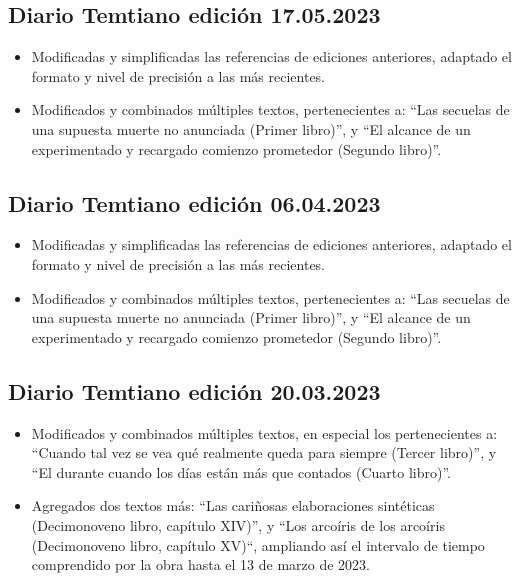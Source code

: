 \documentclass[
]{book}
\begin{document}
\hypertarget{diario-temtiano-ediciuxf3n-17.05.2023}{%
\subsection*{Diario Temtiano edición 17.05.2023}\label{diario-temtiano-ediciuxf3n-17.05.2023}}

\begin{itemize}
\item
  Modificadas y simplificadas las referencias de ediciones anteriores, adaptado el formato y nivel de precisión a las más recientes.
\item
  Modificados y combinados múltiples textos, pertenecientes a: ``Las secuelas de una supuesta muerte no anunciada (Primer libro)'', y ``El alcance de un experimentado y recargado comienzo prometedor (Segundo libro)''.
\end{itemize}

\hypertarget{diario-temtiano-ediciuxf3n-06.04.2023}{%
\subsection*{Diario Temtiano edición 06.04.2023}\label{diario-temtiano-ediciuxf3n-06.04.2023}}

\begin{itemize}
\item
  Modificadas y simplificadas las referencias de ediciones anteriores, adaptado el formato y nivel de precisión a las más recientes.
\item
  Modificados y combinados múltiples textos, pertenecientes a: ``Las secuelas de una supuesta muerte no anunciada (Primer libro)'', y ``El alcance de un experimentado y recargado comienzo prometedor (Segundo libro)''.
\end{itemize}

\hypertarget{diario-temtiano-ediciuxf3n-20.03.2023}{%
\subsection*{Diario Temtiano edición 20.03.2023}\label{diario-temtiano-ediciuxf3n-20.03.2023}}

\begin{itemize}
\item
  Modificados y combinados múltiples textos, en especial los pertenecientes a: ``Cuando tal vez se vea qué realmente queda para siempre (Tercer libro)'', y ``El durante cuando los días están más que contados (Cuarto libro)''.
\item
  Agregados dos textos más: ``Las cariñosas elaboraciones sintéticas (Decimonoveno libro, capítulo XIV)'', y ``Los arcoíris de los arcoíris (Decimonoveno libro, capítulo XV)``, ampliando así el intervalo de tiempo comprendido por la obra hasta el 13 de marzo de 2023.
\end{itemize}
\end{document}
